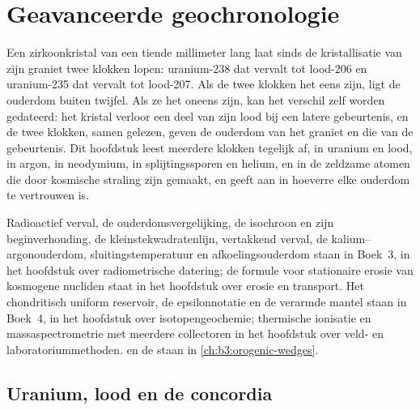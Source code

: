 \chapter{Geavanceerde geochronologie}\label{ch:b3:advanced-geochronology}

Een zirkoonkristal van een tiende millimeter lang laat sinds de kristallisatie van zijn graniet twee klokken lopen:
uranium-238 dat vervalt tot lood-206 en
uranium-235 dat vervalt tot lood-207. Als de twee klokken het eens zijn, ligt de
ouderdom buiten twijfel. Als ze het oneens zijn, kan het verschil zelf worden gedateerd: het
kristal verloor een deel van zijn lood bij een latere gebeurtenis, en de twee klokken, samen gelezen,
geven de ouderdom van het graniet en die van de gebeurtenis. Dit hoofdstuk
leest meerdere klokken tegelijk af, in uranium en lood, in argon, in neodymium, in
splijtingssporen en helium, en in de zeldzame atomen die door kosmische straling zijn gemaakt, en
geeft aan in hoeverre elke ouderdom te vertrouwen is.

\begin{recall}
Radioactief verval, de ouderdomsvergelijking, de isochroon en zijn beginverhouding, de
kleinstekwadratenlijn, vertakkend verval, de kalium--argonouderdom, sluitingstemperatuur
en afkoelingsouderdom staan in Boek~3, in het hoofdstuk over
radiometrische datering; de formule voor stationaire erosie van kosmogene nucliden staat in
het hoofdstuk over erosie en transport. Het chondritisch uniform reservoir, de
epsilonnotatie en de verarmde mantel staan in Boek~4, in het hoofdstuk over
isotopengeochemie; thermische ionisatie en massaspectrometrie met meerdere
collectoren in het hoofdstuk over veld- en laboratoriummethoden.  en
de  staan in \cref{ch:b3:orogenic-wedges}.
\end{recall}

\section{Uranium, lood en de concordia}\label{sec:b3:advanced-geochronology:upb}

